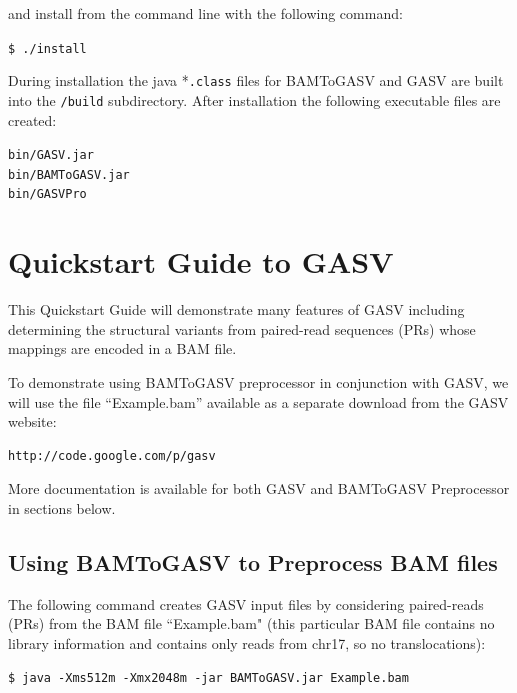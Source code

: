\documentclass[11pt]{article}
\begin{document}
\noindent and install from the command line with the following command:

\begin{framed}
{\normalsize
\noindent \texttt{\$ ./install}
}
\end{framed}

\noindent During installation the java *\verb+.class+ files for BAMToGASV and GASV are built into the \verb+/build+ subdirectory. After installation the following executable files are created:
	
\begin{framed}
{\normalsize
\noindent \texttt{bin/GASV.jar }\\
\noindent \texttt{bin/BAMToGASV.jar }\\
\noindent \texttt{bin/GASVPro}
}
\end{framed}

\section{Quickstart Guide to GASV}

This Quickstart Guide will demonstrate many features of GASV including determining the 
structural variants from paired-read sequences (PRs) whose mappings 
are encoded in a BAM file.

To demonstrate using BAMToGASV preprocessor in conjunction with GASV, we will use the file ``Example.bam'' available as a separate download from the GASV website:

\begin{Verbatim}[frame=single]
http://code.google.com/p/gasv
\end{Verbatim}

More documentation is available for both GASV and BAMToGASV Preprocessor 
in sections below.  

\subsection{Using BAMToGASV to Preprocess BAM files}

The following command creates GASV input files by considering paired-reads (PRs) 
from the BAM file ``Example.bam" (this particular BAM file contains no library information and contains only reads from chr17, so no translocations):
{\normalsize
\begin{Verbatim}[frame=single]
$ java -Xms512m -Xmx2048m -jar BAMToGASV.jar Example.bam
\end{Verbatim}
}
\end{document}

